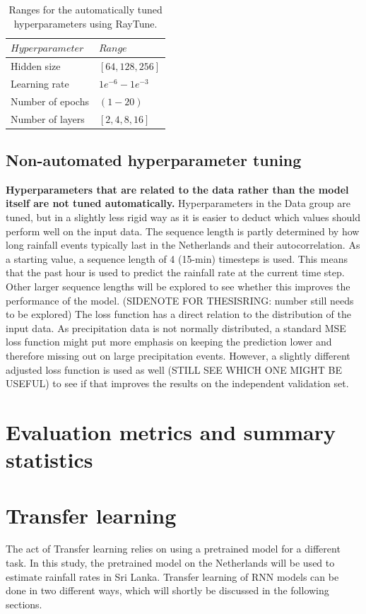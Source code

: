 \documentclass[twocolumn, 10pt, a4paper]{memoir}
\begin{document}
		\begin{table}
			\caption{Ranges for the automatically tuned hyperparameters using RayTune.}
			\label{tab: raytunetable}
			\centering
			\renewcommand{\arraystretch}{1.5}
			\begin{tabular}{p{2.5cm}p{4.2cm}}
				\hline
				$Hyperparameter$&$Range$\\
				\hline
				Hidden size&$[64,128,256]$\\
				Learning rate&$1e^{-6} - 1e^{-3}$\\	
				Number of epochs&$(1 - 20)$\\
				Number of layers&$[2,4,8,16]$\\
				\hline
			\end{tabular}
		\end{table}
		
		\subsection{Non-automated hyperparameter tuning} \label{Nonauto tuning}
		\textbf{Hyperparameters that are related to the data rather than the model itself are not tuned automatically.} Hyperparameters in the Data group are tuned, but in a slightly less rigid way as it is easier to deduct which values should perform well on the input data.
		The sequence length is partly determined by how long rainfall events typically last in the Netherlands and their autocorrelation. As a starting value, a sequence length of 4 (15-min) timesteps is used. This means that the past hour is used to predict the rainfall rate at the current time step. Other larger sequence lengths will be explored to see whether this improves the performance of the model. (SIDENOTE FOR THESISRING: number still needs to be explored)
		The loss function has a direct relation to the distribution of the input data. As precipitation data is not normally distributed, a standard MSE loss function might put more emphasis on keeping the prediction lower and therefore missing out on large precipitation events. However, a slightly different adjusted loss function is used as well (STILL SEE WHICH ONE MIGHT BE USEFUL) to see if that improves the results on the independent validation set. 
	\section{Evaluation metrics and summary statistics} \label{EvalStats}
	\section{Transfer learning} \label{transferlearning}
	The act of Transfer learning relies on using a pretrained model for a different task. In this study, the pretrained model on the Netherlands will be used to estimate rainfall rates in Sri Lanka. Transfer learning of RNN models can be done in two different ways, which will shortly be discussed in the following sections.
\end{document}
